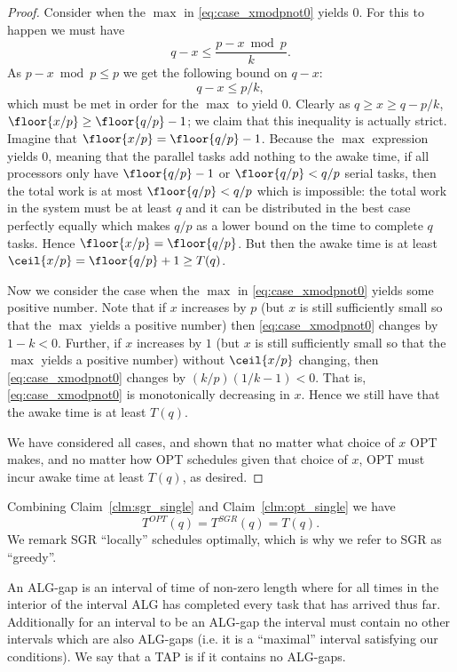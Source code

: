 \begin{proof}
  Consider when the $\max$ in \eqref{eq:case_xmodpnot0} yields $0$. 
  For this to happen we must have
  $$q-x \le \frac{p-x\bmod p}{k}.$$
  As $p-x\bmod p \le p$ we get the following bound on $q-x$:
  $$q-x \le p/k,$$
  which must be met in order for the $\max$ to yield $0$.
  Clearly as $q \ge x \ge q-p/k$, $\floor{x/p} \ge \floor{q/p}-1$; we
  claim that this inequality is actually strict. Imagine that
  $\floor{x/p} = \floor{q/p}-1$. Because the $\max$ expression
  yields $0$, meaning that the parallel tasks add nothing to the
  awake time, if all processors only have $\floor{q/p}-1$ or
  $\floor{q/p} < q/p$ serial tasks, then the total work is at
  most $\floor{q/p} < q/p$ which is impossible: the total work in
  the system must be at least $q$ and it can be distributed in
  the best case perfectly equally which makes $q/p$ as a lower
  bound on the time to complete $q$ tasks. Hence $\floor{x/p} = \floor{q/p}$. 
  But then the awake time is at least $\ceil{x/p} = \floor{q/p} + 1 \ge T(q)$.

  Now we consider the case when the $\max$ in
  \eqref{eq:case_xmodpnot0} yields some positive number.
  Note that if $x$ increases by $p$ (but $x$ is still
  sufficiently small so that the $\max$ yields a positive number)
  then \eqref{eq:case_xmodpnot0} changes by $1-k < 0$.
  Further, if $x$ increases by $1$ (but $x$ is still
  sufficiently small so that the $\max$ yields a positive number) without $\ceil{x/p}$
  changing, then \eqref{eq:case_xmodpnot0} changes by $(k/p)(1/k
  -1) < 0$. That is, \eqref{eq:case_xmodpnot0} is monotonically
  decreasing in $x$. Hence we still have that the awake time is at least $T(q).$

  We have considered all cases, and shown that no matter what
  choice of $x$ OPT makes, and no matter how OPT schedules given
  that choice of $x$, OPT must incur awake time at least $T(q)$,
  as desired.
\end{proof}

Combining Claim~\ref{clm:sgr_single} and
Claim~\ref{clm:opt_single} we have
\begin{equation}
  \label{eq:same_single}
  T^{OPT}(q) = T^{SGR}(q) = T(q).
\end{equation}
We remark SGR \enquote{locally} schedules optimally, which is
why we refer to SGR as \enquote{greedy}. 

An ALG-gap is an interval of time of non-zero length where for
all times in the interior of the interval ALG has completed every
task that has arrived thus far. Additionally for an interval to
be an ALG-gap the interval must contain no other intervals which
are also ALG-gaps (i.e. it is a \enquote{maximal} interval
satisfying our conditions).
We say that a TAP is  if it contains no ALG-gaps.


